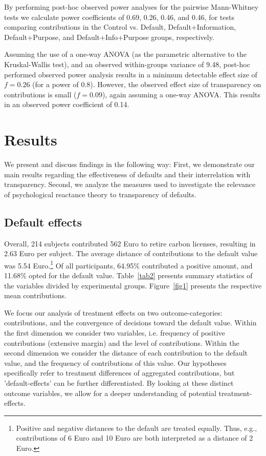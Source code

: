 \documentclass[review, authoryear,12pt]{elsarticle}
\begin{document}
By performing post-hoc observed power analyses for the pairwise Mann-Whitney tests we calculate power coefficients of 0.69, 0.26, 0.46, and 0.46, for tests comparing contributions in the Control vs. Default, Default+Information, Default+Purpose, and Default+Info+Purpose groups, respectively.

Assuming the use of a one-way ANOVA (as the parametric alternative to the Kruskal-Wallis test), and an observed within-groups variance of 9.48, post-hoc performed observed power analysis results in a minimum detectable effect size of $f = 0.26$ (for a power of 0.8). However, the observed effect size of transparency on contributions is small ($f = 0.09$), again assuming a one-way ANOVA. This results in an observed power coefficient of 0.14.

\section{Results}
We present and discuss findings in the following way: First, we demonstrate our main results regarding the effectiveness of defaults and their interrelation with transparency. Second, we analyze the measures used to investigate the relevance of psychological reactance theory to transparency of defaults.

\subsection{Default effects}
Overall, 214 subjects contributed 562 Euro to retire carbon licenses, resulting in 2.63 Euro per subject. The average distance of contributions to the default value was 5.54 Euro.\footnote{Positive and negative distances to the default are treated equally. Thus, e.g., contributions of 6 Euro  and 10 Euro  are both interpreted as a distance of 2 Euro.} Of all participants, 64.95\% contributed a positive amount, and 11.68\% opted for the default value. Table~\ref{tab2} presents summary statistics of the variables divided by experimental groups. Figure~\ref{fig1} presents the respective mean contributions.

We focus our analysis of treatment effects on two outcome-categories: contributions, and the convergence of decisions toward the default value. Within the first dimension we consider two variables, i.e. frequency of positive contributions (extensive margin) and the level of contributions. Within the second dimension we consider the distance of each contribution to the default value, and the frequency of contributions of this value. Our hypotheses specifically refer to treatment differences of aggregated contributions, but 'default-effects' can be further differentiated. By looking at these distinct outcome variables, we allow for a deeper understanding of potential treatment-effects.
\end{document}
